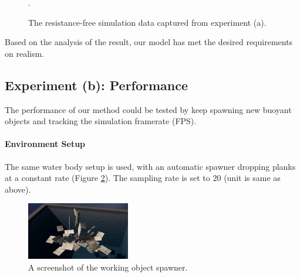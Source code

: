 \begin{figure}[h]
	\centering
	\caption{The resistance-free simulation data captured from experiment (a).}.
	\label{experiment-no-resistance}
\end{figure}

Based on the analysis of the result, our model has met the desired requirements on realism.

\subsection{Experiment (b): Performance}

The performance of our method could be tested by keep spawning new buoyant objects and tracking the simulation framerate (FPS).

\paragraph*{Environment Setup}

The same water body setup is used, with an automatic spawner dropping planks at a constant rate (Figure \ref{spawner-setup}).
The sampling rate is set to 20 (unit is same as above).

\begin{figure}[h]
	\centering
	\includegraphics[width=0.4\textwidth]{../Thesis/figures/spawner-setup.jpg}
	\caption{A screenshot of the working object spawner.}
	\label{spawner-setup}
\end{figure}

